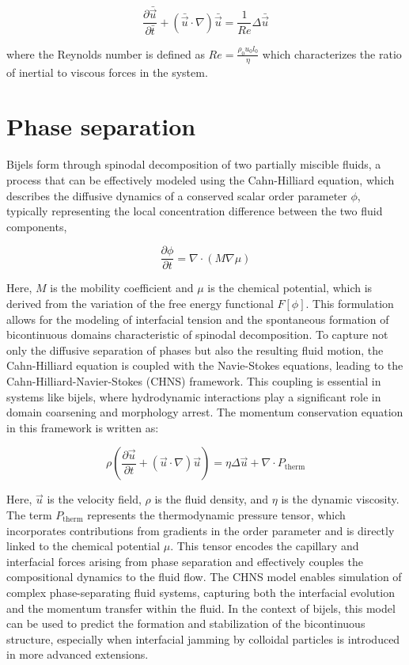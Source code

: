 \begin{equation}
    \frac{\partial \bar{\vec{u}}}{\partial \bar{t}} + (\bar{\vec{u}} \cdot\nabla)\bar{\vec{u}} = \frac{1}{Re} \Delta \bar{\vec{u}}
\end{equation}

where the Reynolds number is defined as $Re = \frac{\rho_0 u_0 l_0}{\eta}$ which characterizes the ratio of inertial to viscous forces in the system.

\section{Phase separation}

Bijels form through spinodal decomposition of two partially miscible fluids, a process that can be effectively modeled using the Cahn-Hilliard equation, which describes the diffusive dynamics 
of a conserved scalar order parameter $\phi$, typically representing the local concentration difference between the two fluid components,

\begin{equation}
    \frac{\partial \phi}{\partial t} = \nabla \cdot \left( M \nabla \mu \right)
\end{equation}

Here, $M$ is the mobility coefficient and $\mu$ is the chemical potential, which is derived from the variation of the free energy functional $F[\phi]$. This formulation allows for the modeling of 
interfacial tension and the spontaneous formation of bicontinuous domains characteristic of spinodal decomposition.
To capture not only the diffusive separation of phases but also the resulting fluid motion, the Cahn-Hilliard equation is coupled with the Navie-Stokes equations, leading to the 
Cahn-Hilliard-Navier-Stokes (CHNS) framework. This coupling is essential in systems like bijels, where hydrodynamic interactions play a significant role in domain coarsening and morphology arrest. 
The momentum conservation equation in this framework is written as:

\begin{equation}
    \rho \left(\frac{\partial\vec{u}}{\partial t} + (\vec{u}\cdot\nabla)\vec{u} \right) = \eta \Delta \vec{u} + \nabla \cdot P_{\text{therm}}
\end{equation}

Here, $\vec{u}$ is the velocity field, $\rho$ is the fluid density, and $\eta$ is the dynamic viscosity. The term $P_{\text{therm}}$ represents the thermodynamic pressure tensor, which incorporates 
contributions from gradients in the order parameter and is directly linked to the chemical potential \(\mu\). This tensor encodes the capillary and interfacial forces arising from phase separation 
and effectively couples the compositional dynamics to the fluid flow.
The CHNS model enables simulation of complex phase-separating fluid systems, capturing both the interfacial evolution and the momentum transfer within the fluid. In the context of bijels, this 
model can be used to predict the formation and stabilization of the bicontinuous structure, especially when interfacial jamming by colloidal particles is introduced in more advanced extensions.

